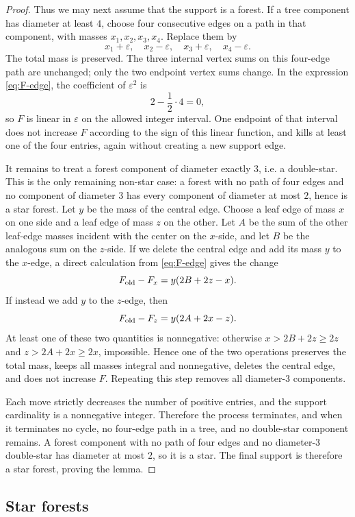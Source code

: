 \documentclass[12pt]{article}
\theoremstyle{plain}
\theoremstyle{definition}
\theoremstyle{remark}
\begin{document}
\begin{proof}
Thus we may next assume that the support is a forest.  If a tree component has
diameter at least \(4\), choose four consecutive edges on a path in that
component, with masses \(x_1,x_2,x_3,x_4\).  Replace them by
\[
  x_1+\varepsilon,
  \quad x_2-\varepsilon,
  \quad x_3+\varepsilon,
  \quad x_4-\varepsilon.
\]
The total mass is preserved.  The three internal vertex sums on this four-edge
path are unchanged; only the two endpoint vertex sums change.  In the expression
\eqref{eq:F-edge}, the coefficient of \(\varepsilon^2\) is
\[
  2-\frac12\cdot4=0,
\]
so \(F\) is linear in \(\varepsilon\) on the allowed integer interval.  One
endpoint of that interval does not increase \(F\) according to the sign of this
linear function, and kills at least one of the four entries, again without
creating a new support edge.

It remains to treat a forest component of diameter exactly \(3\), i.e. a
double-star.  This is the only remaining non-star case: a forest with no path
of four edges and no component of diameter \(3\) has every component of
diameter at most \(2\), hence is a star forest.
Let \(y\) be the mass of the central edge.  Choose a leaf edge of mass \(x\)
on one side and a leaf edge of mass \(z\) on the other.  Let \(A\) be the sum
of the other leaf-edge masses incident with the center on the \(x\)-side, and
let \(B\) be the analogous sum on the \(z\)-side.  If we delete the central
edge and add its mass \(y\) to the \(x\)-edge, a direct calculation from
\eqref{eq:F-edge} gives the change
\[
  F_{\rm old}-F_x = y(2B+2z-x).
\]
If instead we add \(y\) to the \(z\)-edge, then
\[
  F_{\rm old}-F_z = y(2A+2x-z).
\]
At least one of these two quantities is nonnegative: otherwise
\(x>2B+2z\ge2z\) and \(z>2A+2x\ge2x\), impossible.  Hence one of the two
operations preserves the total mass, keeps all masses integral and
nonnegative, deletes the central edge, and does not increase \(F\).  Repeating
this step removes all diameter-\(3\) components.

Each move strictly decreases the number of positive entries, and the support
cardinality is a nonnegative integer.  Therefore the process terminates, and
when it terminates no cycle, no four-edge path in a tree, and no double-star
component remains.  A forest component with no path of four edges and no
diameter-\(3\) double-star has diameter at most \(2\), so it is a star.  The
final support is therefore a star forest, proving the lemma.
\end{proof}

\subsection*{Star forests}
\end{document}
